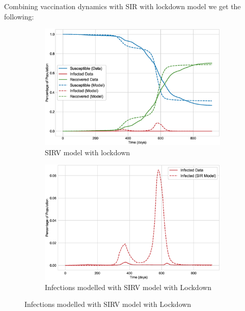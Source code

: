 \documentclass[tikz,fleqn,12pt]{wlscirep}
\begin{document}
Combining vaccination dynamics with SIR with lockdown model we get the following:
\begin{figure}[H]
  \centering
  \caption{SIRV Model with lockdown for India}

  \begin{subfigure}[t]{\textwidth}
    \centering
    \includegraphics[scale=0.50]{images/SIRV_model_with_lockdown_IND.eps}
    \caption{SIRV model with lockdown}
    \label{fig:SIRV_model_with_lockdown_IND}
  \end{subfigure}

  \begin{subfigure}[t]{\textwidth}
    \centering
    \includegraphics[scale=0.50]{images/SIRV_model_with_lockdown_infections_IND.eps}
    \caption{Infections modelled with SIRV model with Lockdown}
    \label{fig:SIRV_model_with_lockdown_infections_IND}
  \end{subfigure}

\end{figure}
\end{document}
